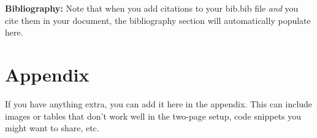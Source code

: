 \documentclass{article}\usepackage[]{graphicx}\usepackage[]{xcolor}
\begin{document}
\begin{multicols}{2}
\vspace{2em}

\noindent\textbf{Bibliography:} Note that when you add citations to your bib.bib file \emph{and}
you cite them in your document, the bibliography section will automatically populate here.

\begin{tiny}

\end{tiny}
\end{multicols}

\newpage
\onecolumn
\section{Appendix}

If you have anything extra, you can add it here in the appendix. This can include images or tables that don't work well in the two-page setup, code snippets you might want to share, etc.
\end{document}
